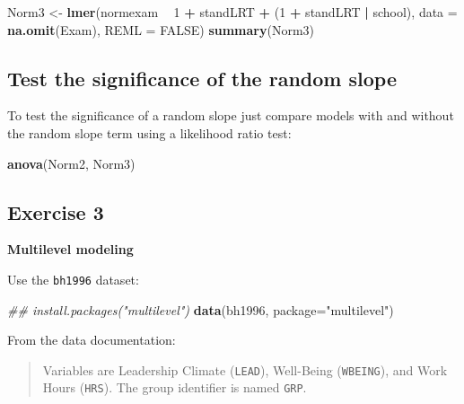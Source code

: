 \documentclass[]{book}
\newenvironment{Shaded}{\begin{snugshade}}{\end{snugshade}}
\newcommand{\CommentTok}[1]{\textcolor[rgb]{0.56,0.35,0.01}{\textit{#1}}}
\newcommand{\DataTypeTok}[1]{\textcolor[rgb]{0.13,0.29,0.53}{#1}}
\newcommand{\DecValTok}[1]{\textcolor[rgb]{0.00,0.00,0.81}{#1}}
\newcommand{\KeywordTok}[1]{\textcolor[rgb]{0.13,0.29,0.53}{\textbf{#1}}}
\newcommand{\NormalTok}[1]{#1}
\newcommand{\OperatorTok}[1]{\textcolor[rgb]{0.81,0.36,0.00}{\textbf{#1}}}
\newcommand{\OtherTok}[1]{\textcolor[rgb]{0.56,0.35,0.01}{#1}}
\newcommand{\StringTok}[1]{\textcolor[rgb]{0.31,0.60,0.02}{#1}}
\begin{document}
\begin{Shaded}
\begin{Highlighting}[]
\NormalTok{  Norm3 <-}\StringTok{ }\KeywordTok{lmer}\NormalTok{(normexam }\OperatorTok{~}\StringTok{ }\DecValTok{1} \OperatorTok{+}\StringTok{ }\NormalTok{standLRT }\OperatorTok{+}\StringTok{ }\NormalTok{(}\DecValTok{1} \OperatorTok{+}\StringTok{ }\NormalTok{standLRT }\OperatorTok{|}\StringTok{ }\NormalTok{school), }
                \DataTypeTok{data =} \KeywordTok{na.omit}\NormalTok{(Exam), }\DataTypeTok{REML =} \OtherTok{FALSE}\NormalTok{) }
  \KeywordTok{summary}\NormalTok{(Norm3) }
\end{Highlighting}
\end{Shaded}

\hypertarget{test-the-significance-of-the-random-slope}{%
\subsection{Test the significance of the random slope}\label{test-the-significance-of-the-random-slope}}

To test the significance of a random slope just compare models with and without the random slope term using a likelihood ratio test:

\begin{Shaded}
\begin{Highlighting}[]
  \KeywordTok{anova}\NormalTok{(Norm2, Norm3) }
\end{Highlighting}
\end{Shaded}

\hypertarget{exercise-3-1}{%
\subsection{Exercise 3}\label{exercise-3-1}}

\textbf{Multilevel modeling}

Use the \texttt{bh1996} dataset:

\begin{Shaded}
\begin{Highlighting}[]
\CommentTok{## install.packages("multilevel")}
\KeywordTok{data}\NormalTok{(bh1996, }\DataTypeTok{package=}\StringTok{"multilevel"}\NormalTok{)}
\end{Highlighting}
\end{Shaded}

From the data documentation:

\begin{quote}
Variables are Leadership Climate (\texttt{LEAD}), Well-Being (\texttt{WBEING}), and Work Hours (\texttt{HRS}). The group identifier is named \texttt{GRP}.
\end{quote}
\end{document}
